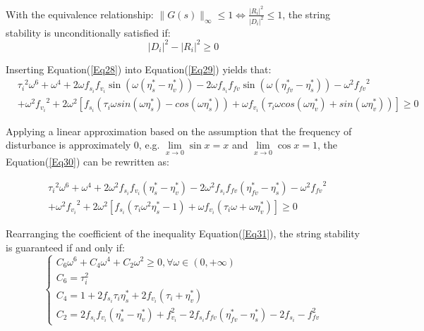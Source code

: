 \documentclass[a4paper]{cas-sc}
\begin{document}
With the equivalence relationship: $\parallel G\left(s\right)\parallel_\infty\le1\Longleftrightarrow\frac{\left|R_i\right|^2}{\left|D_i\right|^2}\le1$, the string stability is unconditionally satisfied if:
\begin{equation}
  {\left| {{D_i}} \right|^2} - {\left| {{R_i}} \right|^2} \geqslant 0
  \label{Eq29}
\end{equation}

Inserting Equation(\ref{Eq28}) into Equation(\ref{Eq29}) yields that:
\begin{equation}
  \begin{aligned}
     & {\tau_i}^2\omega^6+\omega^4+2\omega f_{s_i}f_{v_i}\sin{\left(\omega(\eta_s^\ast-\eta_v^\ast)\right)}-2\omega f_{s_i}f_{fv}\sin{\left(\omega\left(\eta_{fv}^\ast-\eta_s^\ast\right)\right)}-\omega^2{f_{fv}}^2                                         \\
     & +\omega^2{f_{v_i}}^2+2\omega^2\left[f_{s_i}\left(\tau_i\omega sin\left(\omega\eta_s^\ast\right)-cos\left(\omega\eta_s^\ast\right)\right)+\omega f_{v_i}\left(\tau_i\omega cos\left(\omega\eta_v^\ast\right)+sin(\omega\eta_v^\ast)\right)\right]\geq0
  \end{aligned}
  \label{Eq30}
\end{equation}

Applying a linear approximation based on the assumption that the frequency of disturbance is approximately 0, e.g. $\mathop {lim}\limits_{x \to 0} \sin x = x$ and $\mathop {lim}\limits_{x \to 0} \cos x = 1$, the Equation(\ref{Eq30}) can be rewritten as:

\begin{equation}
  \begin{aligned}
     & {\tau_i}^2\omega^6+\omega^4+2\omega^2f_{s_i}f_{v_i}\left(\eta_s^\ast-\eta_v^\ast\right)-2\omega^2f_{s_i}f_{fv}\left(\eta_{fv}^\ast-\eta_s^\ast\right)-\omega^2{f_{fv}}^2 \\
     & +\omega^2{f_{v_i}}^2+2\omega^2\left[f_{s_i}\left(\tau_i\omega^2\eta_s^\ast-1\right)+\omega f_{v_i}\left(\tau_i\omega+\omega\eta_v^\ast\right)\right]\geq0
  \end{aligned}
  \label{Eq31}
\end{equation}

Rearranging the coefficient of the inequality Equation(\ref{Eq31}), the string stability is guaranteed if and only if:
\begin{equation}
  \left\{\begin{array}{l}
    C_{6} \omega^{6}+C_{4} \omega^{4}+C_{2} \omega^{2} \geq 0, \forall \omega \in(0,+\infty) \\
    C_{6}=\tau_{i}^{2}                                                                       \\
    C_{4}=1+2 f_{s_{i}} \tau_{i} \eta_{s}^{*}+2 f_{v_{i}}\left(\tau_{i}+\eta_{v}^{*}\right)  \\
    C_{2}=2 f_{s_{i}} f_{v_{i}}\left(\eta_{s}^{*}-\eta_{v}^{*}\right)+f_{v_{i}}^{2}-2 f_{s_{i}} f_{f v}\left(\eta_{f v}^{*}-\eta_{s}^{*}\right)-2 f_{s_{i}}-f_{f v}^{2}
  \end{array}\right.
  \label{Eq32}
\end{equation}
\end{document}
